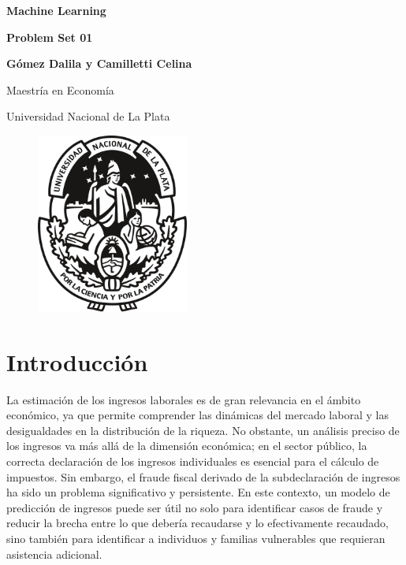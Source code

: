 \documentclass[11pt, a4paper]{article}
\begin{document}
\begin{titlepage}
    \centering
    \vspace*{2cm}
    {\huge\bfseries Machine Learning  \par}
    \vspace{0.5cm}

    {\huge\bfseries Problem Set 01  \par}
    \vspace{0.5cm}
    \vspace{0.5cm}
    {\huge\bfseries\par}
    \vspace{3cm}
    
    {\Large \textbf{Gómez Dalila y Camilletti Celina} \par}
    {\large Maestría en Economía \par}
    {\large Universidad Nacional de La Plata}
    \vspace{1cm}
  
  \begin{figure}[H]
    \centering
    \captionsetup{justification=centering}
    \includegraphics[width=5cm]{../Views/UNLP_Logo_(cropped).svg.png}
\end{figure}
\end{titlepage}


\section{Introducción}
La estimación de los ingresos laborales es de gran relevancia en el ámbito económico, ya que permite comprender las dinámicas del mercado laboral y las desigualdades en la distribución de la riqueza. No obstante, un análisis preciso de los ingresos va más allá de la dimensión económica; en el sector público, la correcta declaración de los ingresos individuales es esencial para el cálculo de impuestos. Sin embargo, el fraude fiscal derivado de la subdeclaración de ingresos ha sido un problema significativo y persistente. En este contexto, un modelo de predicción de ingresos puede ser útil no solo para identificar casos de fraude y reducir la brecha entre lo que debería recaudarse y lo efectivamente recaudado, sino también para identificar a individuos y familias vulnerables que requieran asistencia adicional.
\end{document}
